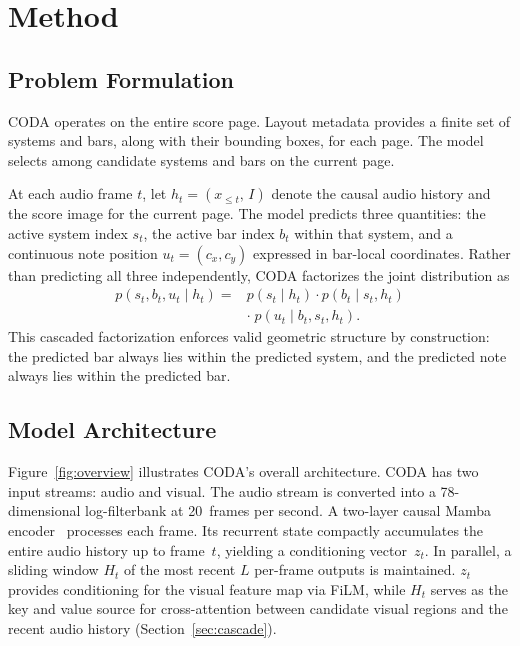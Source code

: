 \section{Method}\label{sec:method}

\subsection{Problem Formulation}

CODA operates on the entire score page. Layout metadata provides a finite set of systems and bars, along with their bounding boxes, for each page. The model selects among candidate systems and bars on the current page.

At each audio frame $t$, let $h_t = (x_{\le t},\, I)$ denote the causal audio history and the score image for the current page. The model predicts three quantities: the active system index $s_t$, the active bar index $b_t$ within that system, and a continuous note position $u_t = (c_x, c_y)$ expressed in bar-local coordinates. Rather than predicting all three independently, CODA factorizes the joint distribution as
\begin{equation}
\begin{split}
p(s_t, b_t, u_t \mid h_t) = {} & p(s_t \mid h_t) \cdot p(b_t \mid s_t, h_t) \\
& \cdot\; p(u_t \mid b_t, s_t, h_t).
\end{split}
\end{equation}
This cascaded factorization enforces valid geometric structure by construction: the predicted bar always lies within the predicted system, and the predicted note always lies within the predicted bar.

\subsection{Model Architecture}

Figure~\ref{fig:overview} illustrates CODA's overall architecture. CODA has two input streams: audio and visual. The audio stream is converted into a 78-dimensional log-filterbank at 20~frames per second. A two-layer causal Mamba encoder~\cite{gu2024mamba} processes each frame. Its recurrent state compactly accumulates the entire audio history up to frame~$t$, yielding a conditioning vector~$z_t$. In parallel, a sliding window $H_t$ of the most recent $L$ per-frame outputs is maintained. $z_t$ provides conditioning for the visual feature map via FiLM, while $H_t$ serves as the key and value source for cross-attention between candidate visual regions and the recent audio history (Section~\ref{sec:cascade}).
 

